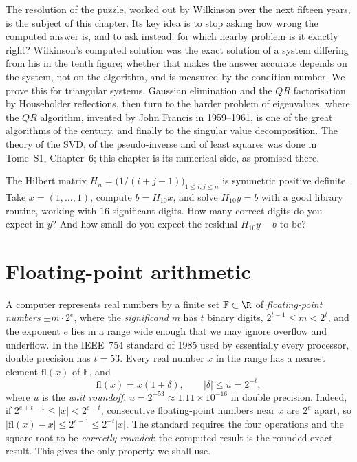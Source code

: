 The resolution of the puzzle, worked out by Wilkinson over the next fifteen years, is the subject of this chapter. Its key idea is to stop asking
how wrong the computed answer is, and to ask instead: for which nearby problem is it exactly right? Wilkinson's computed solution was the exact
solution of a system differing from his in the tenth figure; whether that makes the answer accurate depends on the system, not on the algorithm, and is
measured by the condition number. We prove this for triangular systems, Gaussian elimination and the $QR$ factorisation by Householder reflections,
then turn to the harder problem of eigenvalues, where the $QR$ algorithm, invented by John Francis in 1959--1961, is one of the great algorithms of
the century, and finally to the singular value decomposition. The theory of the SVD, of the pseudo-inverse and of least squares was done in Tome~S1,
Chapter~6; this chapter is its numerical side, as promised there.

\begin{think}
The Hilbert matrix $H_n=\bigl(1/(i+j-1)\bigr)_{1\le i,j\le n}$ is symmetric positive definite. Take $x=(1,\dots,1)$, compute $b=H_{10}x$, and solve
$H_{10}y=b$ with a good library routine, working with $16$ significant digits. How many correct digits do you expect in $y$? And how small do you expect
the residual $H_{10}y-b$ to be?
\end{think}

\section{Floating-point arithmetic}\label{sec:float}

A computer represents real numbers by a finite set $\mathbb F\subset\R$ of \emph{floating-point numbers} $\pm m\cdot2^{e}$, where the
\emph{significand} $m$ has $t$ binary digits, $2^{t-1}\le m<2^t$, and the exponent $e$ lies in a range wide enough that we may ignore overflow and
underflow. In the IEEE~754 standard of 1985 used by essentially every processor, double precision has $t=53$. Every real number $x$ in the range
has a nearest element $\mathrm{fl}(x)$ of $\mathbb F$, and
\[
\mathrm{fl}(x)=x(1+\delta),\qquad|\delta|\le u=2^{-t},
\]
where $u$ is the \emph{unit roundoff}: $u=2^{-53}\approx1.11\times10^{-16}$ in double precision. Indeed, if $2^{e+t-1}\le|x|<2^{e+t}$, consecutive
floating-point numbers near $x$ are $2^e$ apart, so $|\mathrm{fl}(x)-x|\le2^{e-1}\le2^{-t}|x|$. The standard requires the four operations and the
square root to be \emph{correctly rounded}: the computed result is the rounded exact result. This gives the only property we shall use.

